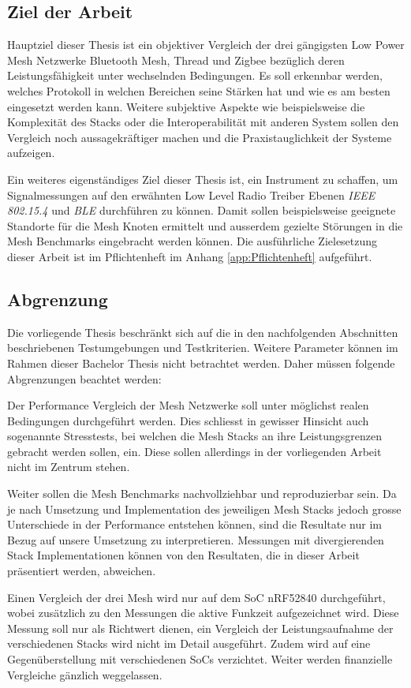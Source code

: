 \subsection{Ziel der Arbeit}\label{subsec:ZielderArbeit}
Hauptziel dieser Thesis ist ein objektiver Vergleich der drei gängigsten Low Power Mesh Netzwerke Bluetooth Mesh, Thread und Zigbee bezüglich deren Leistungsfähigkeit unter wechselnden Bedingungen.
Es soll erkennbar werden, welches Protokoll in welchen Bereichen seine Stärken hat und wie es am besten eingesetzt werden kann.
Weitere subjektive Aspekte wie beispielsweise die Komplexität des Stacks oder die Interoperabilität mit anderen System sollen den Vergleich noch aussagekräftiger machen und die Praxistauglichkeit der Systeme aufzeigen.

Ein weiteres eigenständiges Ziel dieser Thesis ist, ein Instrument zu schaffen, um Signalmessungen auf den erwähnten Low Level Radio Treiber Ebenen \textit{IEEE 802.15.4} und \textit{BLE} durchführen zu können. Damit sollen beispielsweise geeignete Standorte für die Mesh Knoten ermittelt und ausserdem gezielte Störungen in die Mesh Benchmarks eingebracht werden können.
Die ausführliche Zielesetzung dieser Arbeit ist im Pflichtenheft im Anhang \ref{app:Pflichtenheft} aufgeführt.

\subsection{Abgrenzung}\label{sec:Abgrenzung}
Die vorliegende Thesis beschränkt sich auf die in den nachfolgenden Abschnitten beschriebenen Testumgebungen und Testkriterien. Weitere Parameter können im Rahmen dieser Bachelor Thesis nicht betrachtet werden.
Daher müssen folgende Abgrenzungen beachtet werden:

Der Performance Vergleich der Mesh Netzwerke soll unter möglichst realen Bedingungen durchgeführt werden. Dies schliesst in gewisser Hinsicht auch sogenannte Stresstests, bei welchen die Mesh Stacks an ihre Leistungsgrenzen gebracht werden sollen, ein. Diese sollen allerdings in der vorliegenden Arbeit nicht im Zentrum stehen.

Weiter sollen die Mesh Benchmarks nachvollziehbar und reproduzierbar sein. Da je nach Umsetzung und Implementation des jeweiligen Mesh Stacks jedoch grosse Unterschiede in der Performance entstehen können, sind die Resultate nur im Bezug auf unsere Umsetzung zu interpretieren. Messungen mit divergierenden Stack Implementationen können von den Resultaten, die in dieser Arbeit präsentiert werden, abweichen.

Einen Vergleich der drei Mesh wird nur auf dem SoC nRF52840 durchgeführt, wobei zusätzlich zu den Messungen die aktive Funkzeit aufgezeichnet wird. Diese Messung soll nur als Richtwert dienen, ein Vergleich der Leistungsaufnahme der verschiedenen Stacks wird nicht im Detail ausgeführt. Zudem wird auf eine Gegenüberstellung mit verschiedenen SoCs verzichtet. Weiter werden finanzielle Vergleiche gänzlich weggelassen. 

